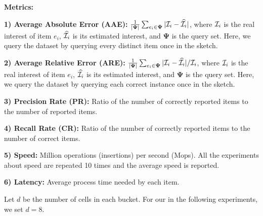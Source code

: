 \noindent\textbf{Metrics:}
\label{subsec:eva:metric}


\noindent\textbf{1) Average Absolute Error (AAE):} $\frac{1}{|\mathbf{\Psi}|} \sum_{e_i \in \mathbf{\Psi}}|\mathcal{I}_i-\widehat{\mathcal{I}_i}| $,
where $\mathcal{I}_i$ is the real interest of item $e_i$, $\widehat{\mathcal{I}_i}$ is its estimated interest, and $\mathbf{\Psi}$ is the query set. 
Here, we query the dataset by querying every distinct item once in the sketch.

\noindent\textbf{2) Average Relative Error (ARE):} $\frac{1}{|\mathbf{\Psi}|} \sum_{e_i \in \mathbf{\Psi}}|\mathcal{I}_i-\widehat{\mathcal{I}_i}|/ \mathcal{I}_i $,
where $\mathcal{I}_i$ is the real interest of item $e_i$, $\widehat{\mathcal{I}_i}$ is its estimated interest, and $\mathbf{\Psi}$ is the query set. 
Here, we query the dataset by querying each correct instance once in the sketch.

\noindent\textbf{3) Precision Rate (PR):}
Ratio of the number of correctly reported items to the number of reported items.

\noindent\textbf{4) Recall Rate (CR):}
Ratio of the number of correctly reported items to the number of correct items.

\noindent\textbf{5) Speed:}
Million operations (insertions) per second (Mops).
All the experiments about speed are repeated 10 times and the average speed is reported.

{\color{reviewD}
\noindent\textbf{6) Latency:}
Average process time needed by each item.
}


Let $d$ be the number of cells in each bucket. For our \sketchname{} in the following experiments, we set $d=8$.

